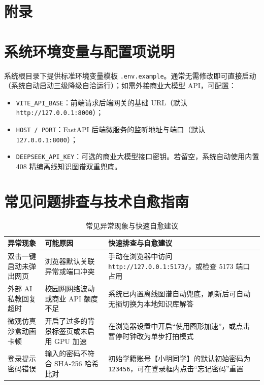 \documentclass[UTF8,a4paper,11pt]{ctexart}
\begin{document}
\clearpage
\appendix
\section*{附录}
\section{系统环境变量与配置项说明}
系统根目录下提供标准环境变量模板 \texttt{.env.example}。通常无需修改即可直接启动（系统自动启动三级降级自洽运行）；如需外接商业大模型 API，可配置：
\begin{itemize}
    \item \texttt{VITE\_API\_BASE}：前端请求后端网关的基础 URL（默认 \texttt{http://127.0.0.1:8000}）；
    \item \texttt{HOST / PORT}：FastAPI 后端微服务的监听地址与端口（默认 \texttt{127.0.0.1:8000}）；
    \item \texttt{DEEPSEEK\_API\_KEY}：可选的商业大模型接口密钥。若留空，系统自动使用内置 408 精编离线知识图谱双重兜底。
\end{itemize}

\section{常见问题排查与技术自愈指南}

\begin{table}[htbp]
\centering
\small
\caption{常见异常现象与快速自愈建议}
\begin{tabularx}{\textwidth}{p{3.8cm}p{4cm}X}
\toprule
\textbf{异常现象} & \textbf{可能原因} & \textbf{快速排查与自愈建议} \\
\midrule
双击一键启动未弹出网页 & 浏览器默认关联异常或端口冲突 & 手动在浏览器中访问 \texttt{http://127.0.0.1:5173/}，或检查 5173 端口占用 \\
外部 AI 私教回复超时 & 校园网网络波动或商业 API 额度不足 & 系统已内置离线图谱自动兜底，刷新后可自动无损切换为本地知识库解答 \\
微观仿真沙盒动画卡顿 & 开启了过多的背景标签页或未启用 GPU 加速 & 在浏览器设置中开启“使用图形加速”，或点击暂停时钟改为单步打拍模式 \\
登录提示密码错误 & 输入的密码不符合 SHA-256 哈希比对 & 初始学籍账号【小明同学】的默认初始密码为 \texttt{123456}，可在登录框内点击“忘记密码”重置 \\
\bottomrule
\end{tabularx}
\end{table}
\end{document}
